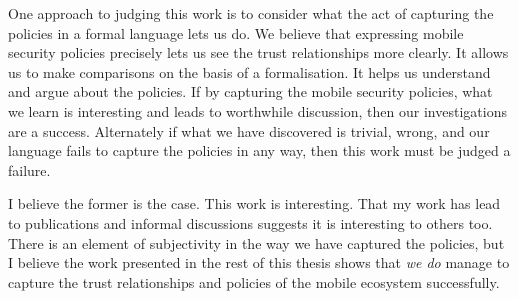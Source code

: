 \documentclass[thesis.tex]{subfiles}
\begin{document}
One approach to judging this work is to consider what the act of capturing the policies in a formal language lets us do.
We believe that expressing mobile security policies precisely lets us see the trust relationships more clearly.
It allows us to make comparisons on the basis of a formalisation.
It helps us understand and argue about the policies.
If by capturing the mobile security policies, what we learn is interesting and leads to worthwhile discussion, then our investigations are a success.
Alternately if what we have discovered is trivial, wrong, and our language
fails to capture the policies in any way, then this work must be judged a failure.

I believe the former is the case.  This work is interesting.  That my
work has lead to publications and informal discussions suggests it is
interesting to others too.  There is an element of subjectivity in the
way we have captured the policies, but I believe the work presented in
the rest of this thesis shows that \emph{we do} manage to capture the
trust relationships and policies of the mobile ecosystem successfully.
\end{document}
